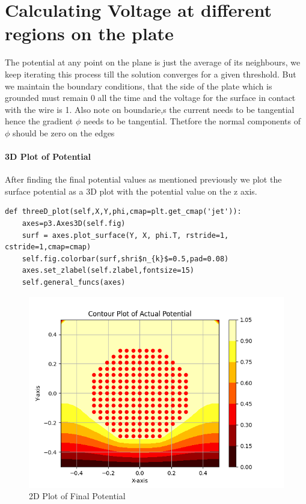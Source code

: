 \documentclass{article}
\begin{document}
\section{Calculating Voltage at different regions on the plate}

The potential at any point on the plane is just the average of its neighbours, we keep iterating this process till the solution converges for
a given threshold. But we maintain the boundary conditions, that the side of the plate which
is grounded must remain 0 all the time and the voltage  for the surface in contact with the
wire is 1. Also note on boundarie,s the current needs to be tangential hence the gradient $\phi$ 
needs to be tangential. Thetfore the normal components of $\phi$ should be zero on the edges

\paragraph{3D Plot of Potential}
After finding the final potential values as mentioned previously we plot the surface potential as a 3D
plot with the potential value on the z axis. 


\begin{lstlisting}
def threeD_plot(self,X,Y,phi,cmap=plt.get_cmap('jet')):
    axes=p3.Axes3D(self.fig) 
    surf = axes.plot_surface(Y, X, phi.T, rstride=1, cstride=1,cmap=cmap)
    self.fig.colorbar(surf,shri$n_{k}$=0.5,pad=0.08)
    axes.set_zlabel(self.zlabel,fontsize=15) 
    self.general_funcs(axes)
\end{lstlisting}

\begin{figure}[ht!]
\centering
\includegraphics[scale=0.6]{plots/Contour Plot of Actual Potential.png}
\caption{2D Plot of Final Potential}
\label{fig:2D Plot of Potential}
\end{figure}
\end{document}
